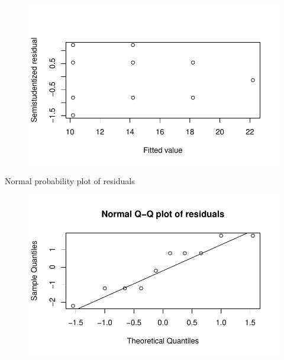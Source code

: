 \documentclass[
  letterpaper,
  DIV=11,
  numbers=noendperiod]{scrartcl}
\newenvironment{Shaded}{\begin{snugshade}}{\end{snugshade}}
\newcommand{\AttributeTok}[1]{\textcolor[rgb]{0.40,0.45,0.13}{#1}}
\newcommand{\FunctionTok}[1]{\textcolor[rgb]{0.28,0.35,0.67}{#1}}
\newcommand{\NormalTok}[1]{\textcolor[rgb]{0.00,0.23,0.31}{#1}}
\newcommand{\SpecialCharTok}[1]{\textcolor[rgb]{0.37,0.37,0.37}{#1}}
\newcommand{\StringTok}[1]{\textcolor[rgb]{0.13,0.47,0.30}{#1}}
\begin{document}
\begin{figure}[H]

{\centering \includegraphics{sta9700_ch3_hw_files/figure-pdf/unnamed-chunk-11-1.pdf}

}

\end{figure}

Normal probability plot of residuals

\begin{Shaded}
\end{Shaded}

\begin{figure}[H]

{\centering \includegraphics{sta9700_ch3_hw_files/figure-pdf/unnamed-chunk-12-1.pdf}

}

\end{figure}
\end{document}
